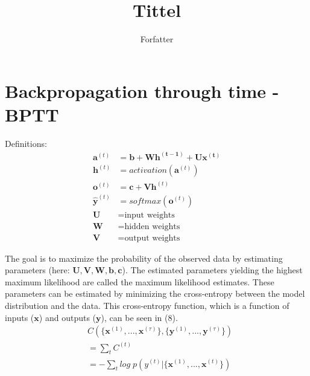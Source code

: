 \documentclass[12pt]{article}
\title{Tittel}
\author{Forfatter}
\date{}
\begin{document}
\maketitle

\section{Backpropagation through time - BPTT}


Definitions:
\begin{align}
    \mathbf{a}^{(t)} &= \mathbf{b + Wh^{(t-1)} + Ux^{(t)}} \\
    \mathbf{h}^{(t)} &= activation(\mathbf{a}^{(t)})\\
    \mathbf{o}^{(t)} &= \mathbf{c + Vh}^{(t)} \\
    \mathbf{\hat{y}}^{(t)} &= softmax(\mathbf{o}^{(t)}) \\
    \mathbf{U} &= \text{input weights} \\
    \mathbf{W} &= \text{hidden weights} \\
    \mathbf{V} &= \text{output weights}
\end{align}


The goal is to maximize the probability of the observed data by estimating parameters (here: $\mathbf{U, V, W, b, c}$). The estimated parameters yielding the highest maximum likelihood are called the maximum likelihood estimates. These parameters can be estimated by minimizing the cross-entropy between the model distribution and the data. %
This cross-entropy function, which is a function of inputs ($\mathbf{x}$) and outputs ($\mathbf{y}$), can be seen in (8).
\begin{align}
    &C\left(\{\mathbf{x}^{(1)},...,\mathbf{x}^{(\tau)}\}, \{\mathbf{y}^{(1)},...,\mathbf{y}^{(\tau)}\}\right) \\
    &= \sum_t C^{(t)} \\
    &= -\sum_t log\;p\left(y^{(t)}|\{\mathbf{x}^{(1)},...,\mathbf{x}^{(t)}\}\right) \\
\end{align}
\end{document}
